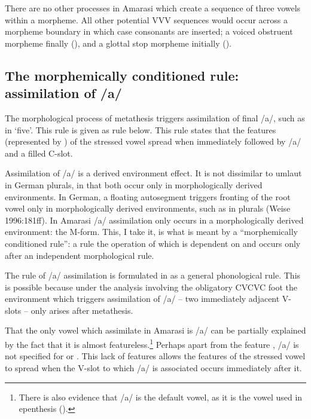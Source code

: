 There are no other processes in Amarasi which create a sequence
of three vowels within a morpheme.
All other potential VVV sequences would occur across a morpheme
boundary in which case consonants are inserted;
a voiced obstruent morpheme finally (),
and a glottal stop morpheme initially ().

\subsection{The morphemically conditioned rule: assimilation of /a/}\label{sec:MorRulAssOfA}
The morphological process of metathesis
triggers assimilation of final /a/,
such as in  {\ra}  `five'.
This rule is given as rule  below.
This rule states that the features (represented by \tsc{[+F.]}) of the stressed vowel spread
when immediately followed by /a/ and a filled C-slot.

\begin{exe}
	\label{ex:'VaC->VC}
\end{exe}

Assimilation of /a/ is a derived environment effect.
It is not dissimilar to umlaut in German plurals,
in that both occur only in morphologically derived environments.
In German, a floating autosegment triggers fronting of the root vowel
only in morphologically derived environments,
such as in plurals (Weise 1996:181ff).
In Amarasi /a/ assimilation only occurs
in a morphologically derived environment: the M-form.
This, I take it, is what is meant by a
``morphemically conditioned rule'':
a rule the operation of which is dependent on
and occurs only after an independent morphological rule.

The rule of /a/ assimilation is formulated 
in  as a general phonological rule.
This is possible because under the analysis involving
the obligatory CVCVC foot the environment which triggers
assimilation of /a/ -- two immediately adjacent V-slots --
only arises after metathesis.

That the only vowel which assimilate in Amarasi is /a/
can be partially explained by the fact that it is almost featureless.\footnote{
		There is also evidence that /a/ is the default vowel,
		as it is the vowel used in epenthesis ().}
Perhaps apart from the feature \tsc{[+low]},
/a/ is not specified for  or .
This lack of features allows the features of the stressed vowel to spread
when the V-slot to which /a/ is associated occurs immediately after it.

